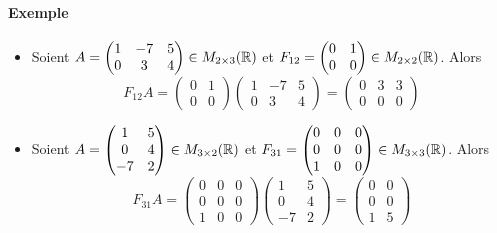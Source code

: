 \paragraph{Exemple}
\begin{itemize}
  \item Soient $A = \begin{pmatrix} 1 & -7 & 5 \\ 0 & 3 & 4 \end{pmatrix} \in M_{2\times 3}(\mathbb{R})$ et $F_{1 2} = \begin{pmatrix} 0 & 1 \\ 0 & 0 \end{pmatrix} \in M_{2 \times 2}(\mathbb{R})$. Alors
    $$F_{1 2} A 
      = \begin{pmatrix} 0 & 1 \\ 0 & 0 \end{pmatrix} \begin{pmatrix} 1 & -7 & 5 \\ 0 & 3 & 4 \end{pmatrix} 
      = \begin{pmatrix} 0 & 3 & 3 \\ 0 & 0 & 0 \end{pmatrix}$$

  \item Soient $A = \begin{pmatrix} 1 & 5 \\ 0 & 4 \\ -7 & 2 \end{pmatrix} \in  M_{3 \times 2}(\mathbb{R})$ et $F_{3 1} = \begin{pmatrix} 0 & 0 & 0 \\ 0 & 0 & 0 \\ 1 & 0 & 0 \end{pmatrix} \in M_{3 \times 3}(\mathbb{R})$. Alors
    $$F_{3 1} A 
      = \begin{pmatrix} 0 & 0 & 0 \\ 0 & 0 & 0 \\ 1 & 0 & 0 \end{pmatrix} \begin{pmatrix} 1 & 5 \\ 0 & 4 \\ -7 & 2 \end{pmatrix} 
      = \begin{pmatrix} 0 & 0 \\ 0 & 0 \\ 1 & 5 \end{pmatrix}$$
      

\end{itemize}
